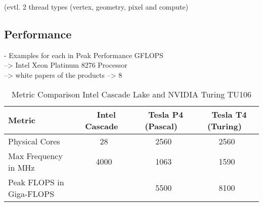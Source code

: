 \documentclass[a4paper,12pt]{llncs}
\numberwithin{equation}{section}
\begin{document}
(evtl. 2 thread types (vertex, geometry, pixel and compute)

         
\subsection{Performance}
  - Examples for each in Peak Performance GFLOPS\\
    --> Intel Xeon Platinum 8276 Processor \\
    --> white papers of the products --> 8
\begin{table}[htbp]
  \centering
  \caption{Metric Comparison Intel Cascade Lake and NVIDIA Turing TU106}
  \label{tab:comp}
  \begin{tabular}{|l|c|c|c|}
    \hline
	\textbf{Metric} & \textbf{~Intel Cascade~} & \textbf{~Tesla P4 (Pascal)~} & \textbf{~Tesla T4 (Turing)~} \\\hline
	Physical Cores & 28 & 2560 & 2560 \\\hline
	Max Frequency in MHz & 4000 & 1063 & 1590 \\\hline
	Peak FLOPS in Giga-FLOPS & & 5500 & 8100 \\\hline
  \end{tabular}
\end{table}

\end{document}
